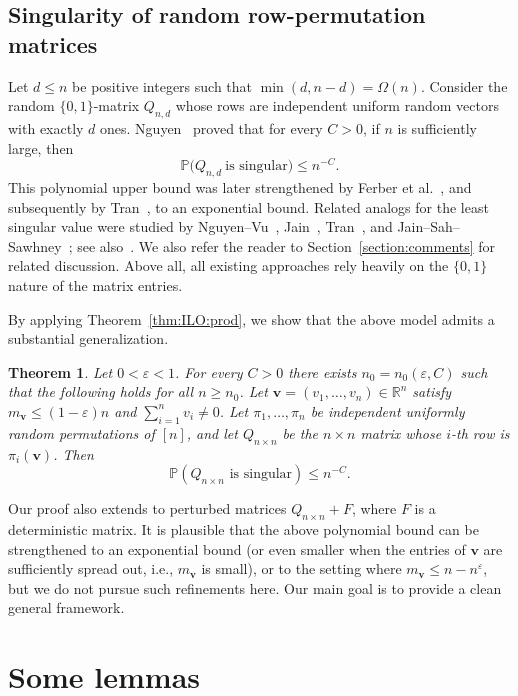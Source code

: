 \documentclass[reqno]{amsart}
\newcommand\R{{\mathbb{R}}}
\renewcommand\P{{\mathbb{P}}}
\newcommand\eps{{\varepsilon}}
\newcommand\BMv{{\bm v}}
\theoremstyle{plain}
\newtheorem{theorem}{Theorem}[section]
\theoremstyle{definition}
\begin{document}
\subsection{Singularity of random row-permutation matrices}\label{sub:sing} Let $d\le n$ 
be positive integers such that
$\min(d,n-d)=\Omega(n)$.
Consider the random $\{0,1\}$-matrix $Q_{n,d}$ whose rows are independent
uniform random vectors with exactly $d$ ones.
Nguyen~\cite{Nguyen} proved that for every $C>0$, if $n$ is sufficiently large, then
\[
\P\bigl(Q_{n,d}\ \text{is singular}\bigr)\le n^{-C}.
\]
This polynomial upper bound was later strengthened by Ferber et al.~\cite{FJLS},
and subsequently by Tran~\cite{Tran}, to an exponential bound.
Related analogs for the least singular value were studied by Nguyen--Vu~\cite{NgV-Comb},
Jain~\cite{Jain}, Tran~\cite{Tran}, and Jain--Sah--Sawhney~\cite{JSS22}; see also~\cite{AChW}.
We also refer the reader to Section~\ref{section:comments} for related discussion.
Above all, all existing approaches rely heavily on the $\{0,1\}$ nature of the matrix entries.

By applying Theorem~\ref{thm:ILO:prod}, we show that the above model
admits a substantial generalization. 

\begin{theorem}\label{thm:singularity}
Let $0<\eps<1$. For every $C>0$ there exists $n_0=n_0(\eps,C)$ such that the following holds for all $n\ge n_0$.
Let $\BMv=(v_1,\dots,v_n)\in\R^n$ satisfy $m_{\BMv}\le (1-\eps)n$ and $\sum_{i=1}^n v_i\neq 0$.
Let $\pi_1,\dots,\pi_n$ be independent uniformly random permutations of $[n]$, and let $Q_{n \times n}$ be the $n\times n$ matrix whose $i$-th row is $\pi_i(\BMv)$.
Then
\[
\P(Q_{n\times n}\text{ is singular})\le n^{-C}.
\]
\end{theorem}



Our proof also extends to perturbed matrices $Q_{n\times n}+F$, where $F$ is a deterministic matrix. It is plausible that the above polynomial bound can be strengthened to an exponential bound
(or even smaller when the entries of $\BMv$ are sufficiently spread out, i.e., $m_{\BMv}$ is small), or to the setting where $m_{\BMv}\le n-n^\eps$, but we do not pursue such refinements here. Our main goal is to provide a clean general framework.


\section{Some lemmas} \label{sect:lemmas}
\end{document}
